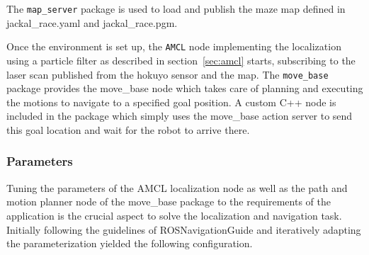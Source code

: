 \documentclass[10pt,journal,compsoc]{IEEEtran}
\begin{document}
The \texttt{map\_server} package is used to load and publish the maze map defined in jackal\_race.yaml and jackal\_race.pgm.

Once the environment is set up, the \texttt{AMCL} node implementing the localization using a particle filter as described in section~\ref{sec:amcl} starts, subscribing to the laser scan published from the hokuyo sensor and the map.
The \texttt{move\_base} package provides the move\_base node which takes care of planning and executing the motions to navigate to a specified goal position.
A custom C++ node is included in the package which simply uses the move\_base action server to send this goal location and wait for the robot to arrive there.



\subsubsection{Parameters}

Tuning the parameters of the AMCL localization node as well as the path and motion planner node of the move\_base package to the requirements of the application is the crucial aspect to solve the localization and navigation task.
Initially following the guidelines of ROSNavigationGuide\cite{ROSNavigationGuide} and iteratively adapting the parameterization yielded the following configuration.
\end{document}
